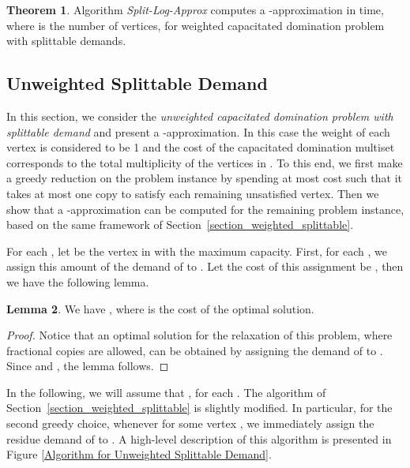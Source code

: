 \documentclass[a4paper,11pt]{article}
\theoremstyle{definition}
\newtheorem{theorem}{Theorem}
\newtheorem{lemma}[theorem]{Lemma}
\begin{document}
\begin{theorem}
Algorithm {\em Split-Log-Approx}
computes a -approximation in  time,
where  is the number of vertices, for
weighted capacitated domination problem with splittable demands.
\end{theorem}



\subsection{Unweighted Splittable Demand} \label{section_unweighted_splittable}

In this section, we consider the {\em unweighted capacitated domination problem with splittable demand} and present a -approximation. In this case the weight  of each vertex  is considered to be 1 and the cost of the capacitated domination multiset  corresponds to the total multiplicity of the vertices in .   To this end, we first make a greedy reduction on the problem instance by spending at most  cost such that it takes at most one copy to satisfy each remaining unsatisfied vertex. Then we show that a -approximation can be computed for the remaining problem instance, based on the same framework of Section~\ref{section_weighted_splittable}.

\smallskip

For each , let  be the vertex in  with the maximum capacity. First, for each , we assign this amount  of the demand of  to . Let the cost of this assignment be , then we have the following lemma.

\begin{lemma} \label{lemma_last_copy}
We have , where  is the cost of the optimal solution.
\end{lemma}

\begin{proof}
Notice that an optimal solution  for the relaxation of this problem, where fractional copies are allowed, can be obtained by assigning the demand  of  to . Since  and , the lemma follows.
\end{proof}

In the following, we will assume that , for each . The algorithm of Section~\ref{section_weighted_splittable} is slightly modified. In particular, for the second greedy choice, whenever  for some vertex , we immediately assign the residue demand of  to . A high-level description of this algorithm 
is presented in Figure \ref{Algorithm for Unweighted Splittable Demand}.
\end{document}
